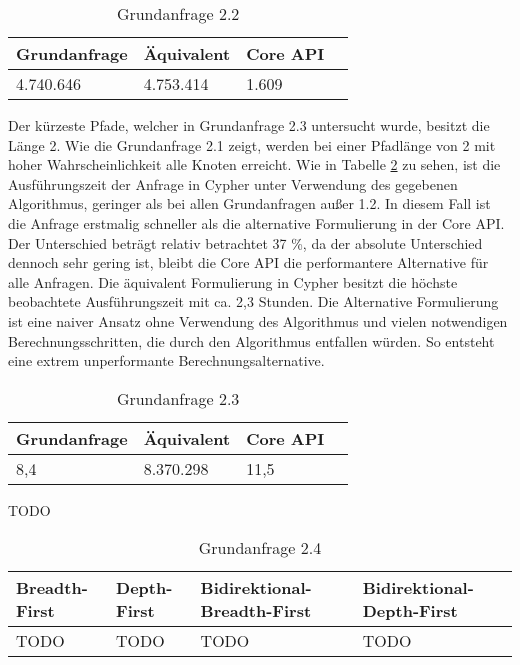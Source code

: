 \FloatBarrier
\begin{table}[h]
	\centering
		\begin{tabular}{ |p{3cm}|p{3cm}|p{3cm}|p{3cm}|  }
			\hline
			Grundanfrage & Äquivalent&Core API\\
			\hline
			4.740.646    & 4.753.414 &  1.609\\
			\hline
		\end{tabular}
		\caption{Grundanfrage 2.2}
		\label{tab:Query2_2}
\end{table}
\FloatBarrier
Der kürzeste Pfade, welcher in Grundanfrage 2.3 untersucht wurde, besitzt die Länge 2. Wie die Grundanfrage 2.1 zeigt, werden bei einer Pfadlänge von 2 mit hoher Wahrscheinlichkeit alle Knoten erreicht. Wie in Tabelle \ref{tab:Query2_3} zu sehen, ist die Ausführungszeit der Anfrage in Cypher unter Verwendung des gegebenen Algorithmus, geringer als bei allen Grundanfragen außer 1.2. In diesem Fall ist die Anfrage erstmalig schneller als die alternative Formulierung in der Core API. Der Unterschied beträgt relativ betrachtet 37 \%, da der absolute Unterschied dennoch sehr gering ist, bleibt die Core API die performantere Alternative für alle Anfragen. \newline
Die äquivalent Formulierung in Cypher besitzt die höchste beobachtete Ausführungszeit mit ca. 2,3 Stunden. Die Alternative Formulierung ist eine naiver Ansatz ohne Verwendung des Algorithmus und vielen notwendigen Berechnungsschritten, die durch den Algorithmus entfallen würden. So entsteht eine extrem unperformante Berechnungsalternative.  
\FloatBarrier
\begin{table}[!htb]
	\centering
		\begin{tabular}{ |p{3cm}|p{3cm}|p{3cm}|p{3cm}|  }
			\hline
			Grundanfrage & Äquivalent&Core API\\
			\hline
			8,4    & 8.370.298 &  11,5\\
			\hline
		\end{tabular}
		\caption{Grundanfrage 2.3}
		\label{tab:Query2_3}
\end{table}
\FloatBarrier
TODO
\FloatBarrier
\begin{table}[!htb]
	\centering
	\begin{tabular}{ |p{3cm}|p{3cm}|p{3cm}|p{3cm}|  }
		\hline
		Breadth-First & Depth-First&Bidirektional-Breadth-First &Bidirektional-Depth-First\\
		\hline
		TODO    & TODO &  TODO  &  TODO\\
		\hline
	\end{tabular}
	\caption{Grundanfrage 2.4}
\end{table}
\FloatBarrier
